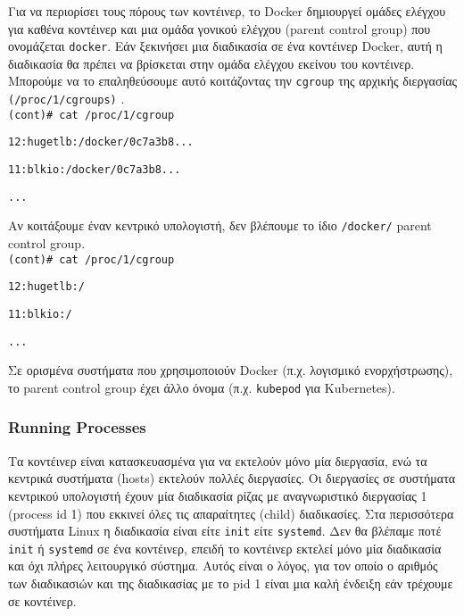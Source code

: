 Για να περιορίσει τους πόρους των κοντέινερ, το \textlatin{Docker} δημιουργεί
ομάδες ελέγχου για καθένα κοντέινερ και μια ομάδα γονικού ελέγχου
(\textlatin{parent control group}) που ονομάζεται \texttt{\textlatin{docker}}.
Εάν ξεκινήσει μια διαδικασία σε ένα κοντέινερ \textlatin{Docker}, αυτή η
διαδικασία θα πρέπει να βρίσκεται στην ομάδα ελέγχου εκείνου του κοντέινερ.
Μπορούμε να το επαληθεύσουμε αυτό κοιτάζοντας την \texttt{\textlatin{cgroup}}
της αρχικής διεργασίας \texttt{\textlatin{(/proc/1/cgroups)}}
\cite{Metasploit-Linux-Gather-Container-Detection}. \\

\texttt{\textlatin{(cont)\# cat /proc/1/cgroup}}

\texttt{\textlatin{12:hugetlb:/docker/0c7a3b8...}}

\texttt{\textlatin{11:blkio:/docker/0c7a3b8...}}

\texttt{\textlatin{...}}

Αν κοιτάξουμε έναν κεντρικό υπολογιστή, δεν βλέπουμε το ίδιο
\texttt{\textlatin{/docker/}} \textlatin{parent control group}. \\

\texttt{\textlatin{(cont)\# cat /proc/1/cgroup}}

\texttt{\textlatin{12:hugetlb:/}}

\texttt{\textlatin{11:blkio:/}}

\texttt{\textlatin{...}}

Σε ορισμένα συστήματα που χρησιμοποιούν \textlatin{Docker} (π.χ. λογισμικό
ενορχήστρωσης), το \textlatin{parent control group} έχει άλλο όνομα (π.χ.
\texttt{\textlatin{kubepod}} για \textlatin{Kubernetes}).

\subsubsection{\textlatin{Running Processes}}

Τα κοντέινερ είναι κατασκευασμένα για να εκτελούν μόνο μία διεργασία, ενώ τα
κεντρικά συστήματα (\textlatin{hosts}) εκτελούν πολλές διεργασίες. Οι
διεργασίες σε συστήματα κεντρικού υπολογιστή έχουν μία διαδικασία ρίζας
με αναγνωριστικό διεργασίας 1 (\textlatin{process id 1}) που εκκινεί όλες τις
απαραίτητες (\textlatin{child}) διαδικασίες. Στα περισσότερα συστήματα
\textlatin{Linux} η διαδικασία είναι είτε \texttt{\textlatin{init}} είτε
\texttt{\textlatin{systemd}}. Δεν θα βλέπαμε ποτέ \texttt{\textlatin{init}} ή
\texttt{\textlatin{systemd}} σε ένα κοντέινερ, επειδή το κοντέινερ εκτελεί μόνο
μία διαδικασία και όχι πλήρες λειτουργικό σύστημα. Αυτός είναι ο λόγος, για τον
οποίο ο αριθμός των διαδικασιών και της διαδικασίας με το \textlatin{pid} 1
είναι μια καλή ένδειξη εάν τρέχουμε σε κοντέινερ.

